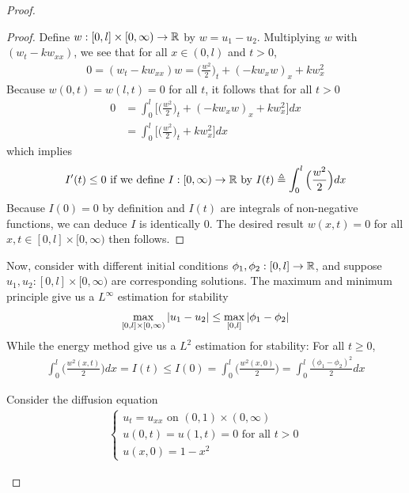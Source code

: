 \documentclass{report}
\begin{document}
\begin{proof}
\begin{theorem}
\end{theorem}
\begin{proof}
Define $w:[0,l]\times [0,\infty)\rightarrow \mathbb{R}$ by $w=u_1-u_2$. Multiplying $w$ with $(w_t-kw_{xx})$, we see that for all $x\in (0,l)$ and $t> 0$, 
\begin{align*}
0=(w_t-kw_{xx})w= \Big(\frac{w^2}{2}\Big)_t + (-kw_xw)_x + kw_x^2
\end{align*}
Because $w(0,t)=w(l,t)=0$ for all $t$, it follows that for all $t>0$ 
\begin{align*}
0&=\int_0^l \Big[\Big(\frac{w^2}{2}\Big)_t + (-kw_xw)_x + kw_x^2\Big]dx  \\
 &=\int_0^l \Big[\Big(\frac{w^2}{2}\Big)_t + kw_x^2\Big]dx
\end{align*}
which implies   
\begin{align*}
I'(t)\leq 0\text{ if we define }I:[0,\infty)\rightarrow \mathbb{R}\text{ by }I(t)\triangleq \int_0^l \Big(\frac{w^2}{2} \Big)dx 
\end{align*}
Because $I(0)=0$ by definition and $I(t)$ are integrals of non-negative functions, we can deduce $I$ is identically $0$. The desired result $w(x,t)=0$ for all $x,t \in [0,l]\times [0,\infty)$ then follows. 
\end{proof}
\begin{mdframed}
Now, consider  with different initial conditions $\phi_1,\phi_2: [0,l]\rightarrow \mathbb{R}$, and suppose $u_1,u_2:[0,l]\times [0,\infty)$ are corresponding solutions. The maximum and minimum principle give us a $L^\infty$ estimation for stability 
\begin{align*}
\max_{[0,l]\times [0,\infty)} \left|u_1-u_2\right|\leq \max_{[0,l]}\left|\phi_1-\phi_2\right|
\end{align*}
While the energy method give us a $L^2$ estimation for  stability: For all $t\geq 0$,  
\begin{align*}
\int_0^l \Big(\frac{w^2(x,t)}{2} \Big)dx =I(t)\leq I(0)=\int_0^l \Big(\frac{w^2(x,0)}{2} \Big)= \int_0^l \frac{(\phi_1-\phi_2)^2}{2}dx
\end{align*}
\end{mdframed}
\begin{question}{}{}
Consider the diffusion equation  
\begin{align*}
\begin{cases}  
u_t=u_{xx}\text{ on }(0,1)\times (0,\infty)\\
u(0,t)=u(1,t)=0 \text{ for all }t>0\\
u(x,0)=1-x^2
\end{cases}

\end{align*}
\end{question}
\end{proof}
\end{document}
